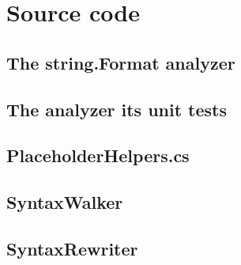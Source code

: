 \documentclass[pdftex,a4paper,12pt,twoside]{report}
\begin{document}
\appendix

\chapter{Source code}
\label{ch:sourcecode}


\section{The string.Format analyzer}


\section{The analyzer its unit tests}


\section{PlaceholderHelpers.cs}


\section{SyntaxWalker}


\section{SyntaxRewriter}

\end{document}
